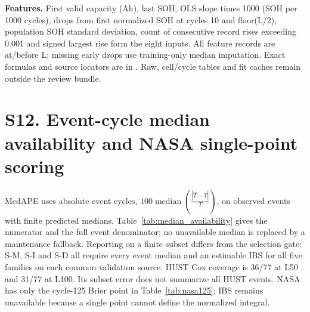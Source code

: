 \documentclass[10pt,a4paper]{article}
\begin{document}
\textbf{Features.} First valid capacity (Ah), last SOH, OLS slope times 1000 (SOH per 1000 cycles), drops from first normalized SOH at cycles 10 and floor(L/2), population SOH standard deviation, count of consecutive record rises exceeding 0.001 and signed largest rise form the eight inputs. All feature records are at/before L; missing early drops use training-only median imputation. Exact formulas and source locators are in . Raw, cell/cycle tables and fit caches remain outside the review bundle.


\section*{S12. Event-cycle median availability and NASA single-point scoring}
MedAPE uses absolute event cycles, $100\operatorname{median}\left(\frac{|\widehat T-T|}{T}\right)$, on observed events with finite predicted medians. Table~\ref{tab:median_availability} gives the numerator and the full event denominator; no unavailable median is replaced by a maintenance fallback. Reporting on a finite subset differs from the selection gate: S-M, S-I and S-D all require every event median and an estimable IBS for all five families on each common validation source. HUST Cox coverage is 36/77 at L50 and 31/77 at L100. Its subset error does not summarize all HUST events. NASA has only the cycle-125 Brier point in Table~\ref{tab:nasa125}; IBS remains unavailable because a single point cannot define the normalized integral.
\end{document}

